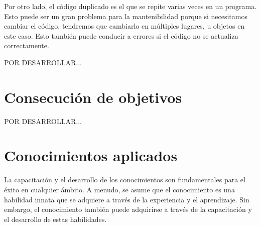 \documentclass[a4paper, 12pt]{book}
\begin{document}
Por otro lado, el código duplicado es el que se repite varias veces en un programa. Esto puede ser un gran problema para la mantenibilidad porque si necesitamos cambiar el código, tendremos que cambiarlo en múltiples lugares, u objetos en este caso. Esto también puede conducir a errores si el código no se actualiza correctamente.

POR DESARROLLAR...

\section{Consecución de objetivos}
\label{sec:consecucion-objetivos}





POR DESARROLLAR...

\section{Conocimientos aplicados}
\label{sec:aplicacion}


La capacitación y el desarrollo de los conocimientos son fundamentales para el éxito en cualquier ámbito. A menudo, se asume que el conocimiento es una habilidad innata que se adquiere a través de la experiencia y el aprendizaje. Sin embargo, el conocimiento también puede adquirirse a través de la capacitación y el desarrollo de estas habilidades.
\end{document}

